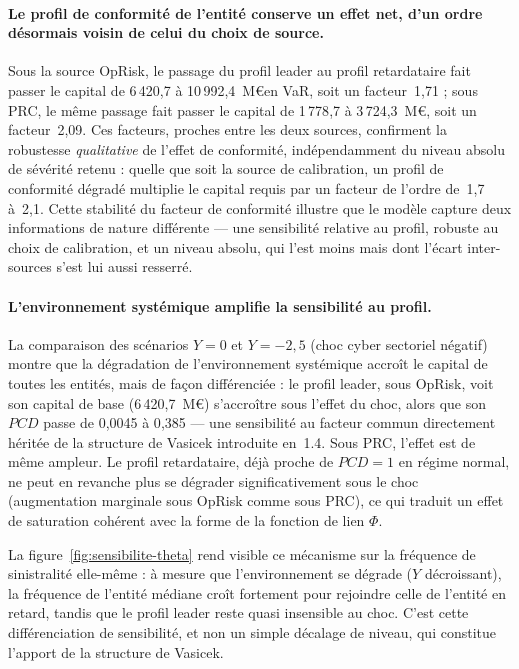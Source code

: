\documentclass[11pt,a4paper]{article}
\theoremstyle{navystyle}
\theoremstyle{navydef}
\begin{document}
\paragraph{Le profil de conformité de l'entité conserve un effet net, d'un
ordre désormais voisin de celui du choix de source.} Sous la source
OpRisk, le passage du profil leader au profil retardataire fait passer le
capital de 6\,420{,}7 à 10\,992{,}4~M\euro en VaR, soit un facteur~1{,}71 ;
sous PRC, le même passage fait passer le capital de 1\,778{,}7 à
3\,724{,}3~M\euro, soit un facteur~2{,}09. Ces facteurs, proches entre les deux
sources, confirment la robustesse \emph{qualitative} de l'effet de
conformité, indépendamment du niveau absolu de sévérité retenu : quelle que
soit la source de calibration, un profil de conformité dégradé multiplie le
capital requis par un facteur de l'ordre de~1{,}7 à~2{,}1. Cette stabilité du
facteur de conformité illustre que le modèle capture deux informations de
nature différente --- une sensibilité relative au profil, robuste au choix
de calibration, et un niveau absolu, qui l'est moins mais dont l'écart
inter-sources s'est lui aussi resserré.

\paragraph{L'environnement systémique amplifie la sensibilité au profil.}
La comparaison des scénarios $Y = 0$ et $Y = -2{,}5$ (choc cyber
sectoriel négatif) montre que la dégradation de l'environnement systémique
accroît le capital de toutes les entités, mais de façon différenciée : le
profil leader, sous OpRisk, voit son capital de base (6\,420{,}7~M\euro) s'accroître
sous l'effet du choc, alors que son $PCD$ passe de 0{,}0045 à 0{,}385 --- une
sensibilité au facteur commun directement héritée de la structure de Vasicek 
introduite en~1.4. Sous PRC, l'effet est de même ampleur. Le profil retardataire, 
déjà proche de $PCD = 1$ en régime normal, ne peut en revanche plus se dégrader 
significativement sous le choc (augmentation marginale sous OpRisk comme sous PRC), 
ce qui traduit un effet de saturation cohérent avec la forme de la fonction de lien $\Phi$.

La figure~\ref{fig:sensibilite-theta} rend visible ce mécanisme sur la
fréquence de sinistralité elle-même : à mesure que l'environnement se dégrade
($Y$ décroissant), la fréquence de l'entité médiane croît fortement pour
rejoindre celle de l'entité en retard, tandis que le profil leader reste quasi
insensible au choc. C'est cette différenciation de sensibilité, et non un
simple décalage de niveau, qui constitue l'apport de la structure de Vasicek.
\end{document}
